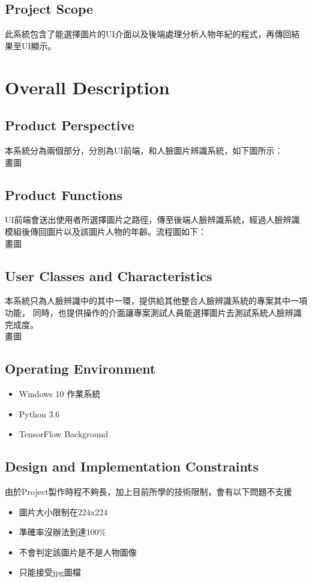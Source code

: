 \documentclass{scrreprt}
\begin{document}
\begin{CJK}{UTF8}{bkai}
\section{Project Scope}
此系統包含了能選擇圖片的UI介面以及後端處理分析人物年紀的程式，再傳回結果至UI顯示。


\chapter{Overall Description}

\section{Product Perspective}
本系統分為兩個部分，分別為UI前端，和人臉圖片辨識系統，如下圖所示：\\
畫圖

\section{Product Functions}
UI前端會送出使用者所選擇圖片之路徑，傳至後端人臉辨識系統，經過人臉辨識模組後傳回圖片以及該圖片人物的年齡。流程圖如下：\\
畫圖

\section{User Classes and Characteristics}
本系統只為人臉辨識中的其中一環，提供給其他整合人臉辨識系統的專案其中一項功能，
同時，也提供操作的介面讓專案測試人員能選擇圖片去測試系統人臉辨識完成度。\\
畫圖

\section{Operating Environment}
\begin{itemize}
    \item Windows 10 作業系統
    \item Python 3.6
    \item TensorFlow Background
\end{itemize}

\section{Design and Implementation Constraints}
由於Project製作時程不夠長，加上目前所學的技術限制，會有以下問題不支援
\begin{itemize}
    \item 圖片大小限制在224x224
    \item 準確率沒辦法到達100\%
    \item 不會判定該圖片是不是人物圖像
    \item 只能接受jpg圖檔
\end{itemize}


\end{CJK}
\end{document}
